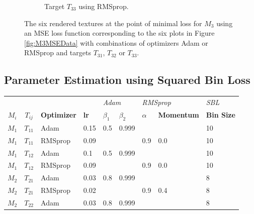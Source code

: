 \begin{figure}
\begin{subfigure}[t]{.25\textwidth}
    \caption{Target $T_{33}$ using RMSprop.}
    \label{fig:M3MSEFinalRendersRealLifeRMSprop}
\end{subfigure}
\caption{The six rendered textures at the point of minimal loss for $M_3$ using an MSE loss function corresponding to the six plots in Figure \ref{fig:M3MSEData} with combinations of optimizers Adam or RMSprop and targets $T_{31}$, $T_{32}$ or $T_{33}$.}
\label{fig:M3MSEFinalRenders}
\end{figure}

\subsection{Parameter Estimation using Squared Bin Loss}

\begin{table}[h]
\centering
\begin{tabular}{cclllllll}
\textbf{}      &                   & \textbf{}          & \multicolumn{1}{l|}{}            & \multicolumn{2}{l|}{\textit{Adam}}                           & \multicolumn{2}{l|}{\textit{RMSprop}}                      & \multicolumn{1}{l|}{\textit{SBL}}      \\
\textbf{$M_i$} & \textbf{$T_{ij}$} & \textbf{Optimizer} & \multicolumn{1}{l|}{\textbf{lr}} & \textbf{$\beta_1$} & \multicolumn{1}{l|}{\textbf{$\beta_2$}} & \textbf{$\alpha$} & \multicolumn{1}{l|}{\textbf{Momentum}} & \multicolumn{1}{l|}{\textbf{Bin Size}} \\ \hline
 $M_1$      & $T_{11}$   & Adam       & 0.15       & 0.5        & 0.999      &            &            & 10        \\
 $M_1$      & $T_{11}$   & RMSprop    & 0.09       &            &            & 0.9        & 0.0        & 10        \\
 $M_1$      & $T_{12}$   & Adam       & 0.1        & 0.5        & 0.999      &            &            & 10        \\
 $M_1$      & $T_{12}$   & RMSprop    & 0.09       &            &            & 0.9        & 0.0        & 10        \\
 $M_2$     & $T_{21}$   & Adam       & 0.03       & 0.8        & 0.999      &            &            & 8          \\
 $M_2$     & $T_{21}$   & RMSprop    & 0.02       &            &            & 0.9        & 0.4        & 8          \\
 $M_2$     & $T_{22}$   & Adam       & 0.03       & 0.8        & 0.999      &            &            & 8          \\

\end{tabular}
\end{table}

